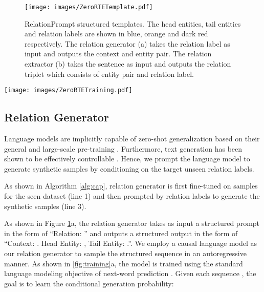 \documentclass[11pt]{article}
\newcommand{\flag}[1]{#1}
\begin{document}
\begin{figure}[!t]
\centering
\texttt{[image: images/ZeroRTETemplate.pdf]}
\caption{
RelationPrompt structured templates.
The head entities, tail entities and relation labels are shown in blue, orange and dark red respectively.
The relation generator (a) takes the relation label as input and outputs the context and entity pair.
The relation extractor (b) takes the sentence as input and outputs the relation triplet which consists of entity pair and relation label. 
}
\label{fig:template}
\end{figure}


\begin{figure*}[!t]
\centering
\texttt{[image: images/ZeroRTETraining.pdf]}
\caption{
    Model training process. 
    Each head entity, tail entity and relation label is shown in blue, orange and dark red respectively.
    To conserve space, the sentences shown are shortened and punctuation is not separated.
The relation generator (a) is trained with the standard language modeling objective to condition on the relation label and generate the sentence and entity pair.
    The relation extractor (b) is trained with the standard sequence-to-sequence objective to condition on the input sentence and output the relation triplet of entity pair and relation label.
}
\label{fig:training}
\end{figure*}





\subsection{Relation Generator}
Language models are implicitly capable of zero-shot generalization based on their general and large-scale pre-training \cite{radford2019language}.
Furthermore, text generation has been shown to be effectively controllable \cite{keskar2019ctrl}.
Hence, we prompt the language model to generate synthetic samples by conditioning on the target unseen relation labels.
\flag{
As shown in Algorithm \ref{alg:cap}, relation generator  is first fine-tuned on samples for the seen dataset  (line 1) and then prompted by relation labels  to generate the synthetic samples  (line 3).
}
As shown in Figure \ref{fig:template}a, the relation generator takes as input a structured prompt in the form of ``Relation: '' and outputs a structured output in the form of ``Context: . Head Entity: , Tail Entity: .''. We employ a causal language model as our relation generator to sample the structured sequence in an autoregressive manner.
As shown in \ref{fig:training}a, the model  is trained using the standard language modeling objective of next-word prediction \cite{bengio2003neural}.
Given each sequence , the goal is to learn the conditional generation probability:
\end{document}
